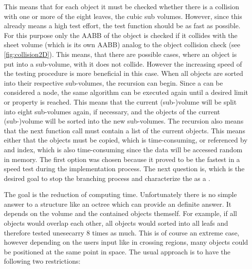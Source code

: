 This means that for each object it must be checked whether there is a collision with one or more of the eight leaves, \ie the cubic sub volumes.
However, since this already means a high test effort, the test function should be as fast as possible.
For this purpose only the \ac{AABB} of the object is checked if it collides with the sheet volume (which is its own \ac{AABB}) analog to the object collision check (see \cref{fig:collision2D}).
This means, that there are possible cases, where an object is put into a sub-volume, with it does not collide.
However the increasing speed of the testing procedure is more beneficial in this case.
% 
When all objects are sorted into their respective sub-volumes, the recursion can begin.
Since a  can be considered a node, the same algorithm can be executed again until a desired limit or property is reached.
This means that the current (sub-)volume will be split into eight sub-volumes again, if necessary, and the objects of the current (sub-)volume will be sorted into the new sub-volumes.
The recursion also means that the next function call must contain a list of the current objects.
This means either that the objects must be copied, which is time-consuming, or referenced by \eg{} and index, which is also time-consuming since the data will be accessed random in memory. 
The first option was chosen because it proved to be the fastest in a speed test during the implementation process.
The next question is, which is the desired goal to stop the branching process and characterize the  as a .
\par
% 
The goal is the reduction of computing time.
Unfortunately there is no simple answer to a structure like an octree which can provide an definite answer.
It depends on the volume and the contained objects themself.
For example, if all objects would overlap each other, all objects would sorted into all leafs and therefore tested unesecarry 8 times as much.
This is of course an extreme case, however depending on the users input like in crossing regions, many objects could be positioned at the same point in space.
The usual approach is to have the following two restrictions:
% 
